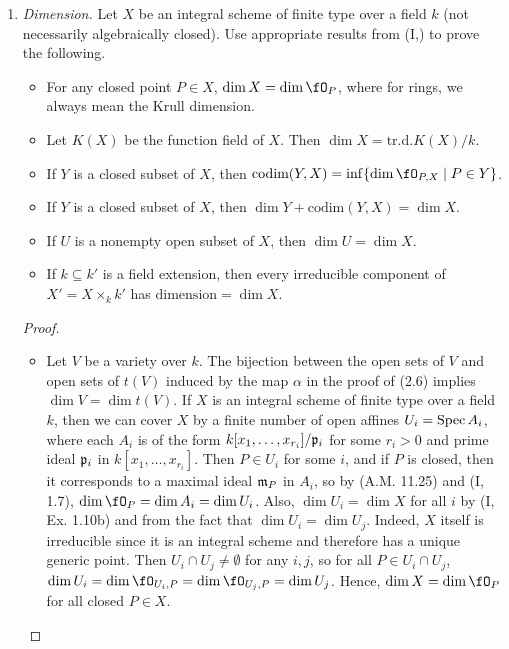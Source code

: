 \documentclass[a4paper]{article}
\begin{document}
\begin{enumerate} [label=\textbf{\arabic*.}, leftmargin=0em]
    \item[\textbf{20.}] \textit{Dimension.} Let $X$ be an integral scheme of finite type over a field $k$ (not necessarily algebraically closed). Use appropriate results from (I,) to prove the following.
          \begin{itemize}
              \item[(a)] For any closed point $P \in X$, $\dim{X} = \dim{\fO_P}$, where for rings, we always mean the Krull dimension.
              \item[(b)] Let $K(X)$ be the function field of $X$. Then $\dim{X} = \text{tr.d.} K(X) / k$.
              \item[(c)] If $Y$ is a closed subset of $X$, then $\text{codim}(Y, X) = \inf\{\dim{\fO_{P, X}} \mid P \in Y\}$.
              \item[(d)] If $Y$ is a closed subset of $X$, then $\dim{Y} + \text{codim}(Y, X) = \dim{X}$.
              \item[(e)] If $U$ is a nonempty open subset of $X$, then $\dim{U} = \dim{X}$.
              \item[(f)] If $k \subseteq k'$ is a field extension, then every irreducible component of $X' = X \times_k k'$ has $\text{dimension} = \dim{X}$.
          \end{itemize}

          \begin{proof} $ $ \vspace{0pt}
              \begin{itemize} [leftmargin=0cm]
                  \item[(a)] Let $V$ be a variety over $k$. The bijection between the open sets of $V$ and open sets of $t(V)$ induced by the map $\alpha$ in the proof of (2.6) implies $\dim{V} = \dim{t(V)}$.
                        If $X$ is an integral scheme of finite type over a field $k$, then we can cover $X$ by a finite number of open affines $U_i = \operatorname{Spec}{A_i}$, where each $A_i$ is of the form $k[x_1, \dots, x_{r_i}] / \mathfrak{p}_i$ for some $r_i > 0$ and prime ideal $\mathfrak{p}_i$ in $k[x_1, \dots, x_{r_i}]$. Then $P \in U_i$ for some $i$, and if $P$ is closed, then it corresponds to a maximal ideal $\mathfrak{m}_P$ in $A_i$, so by (A.M. 11.25) and (I, 1.7), $\dim{\fO_P} = \dim{A_i} = \dim{U_i}$.
                        Also, $\dim{U_i} = \dim{X}$ for all $i$ by (I, Ex. 1.10b) and from the fact that $\dim{U_i} = \dim{U_j}$.
                        Indeed, $X$ itself is irreducible since it is an integral scheme and therefore has a unique generic point. Then $U_i \cap U_j \neq \emptyset$ for any $i, j$, so for all $P \in U_i \cap U_j$, $\dim{U_i} = \dim{\fO_{U_i, P}} = \dim{\fO_{U_j, P}} = \dim{U_j}$. Hence, $\dim{X} = \dim{\fO_P}$ for all closed $P \in X$.


\end{itemize}
\end{proof}
\end{enumerate}
\end{document}
